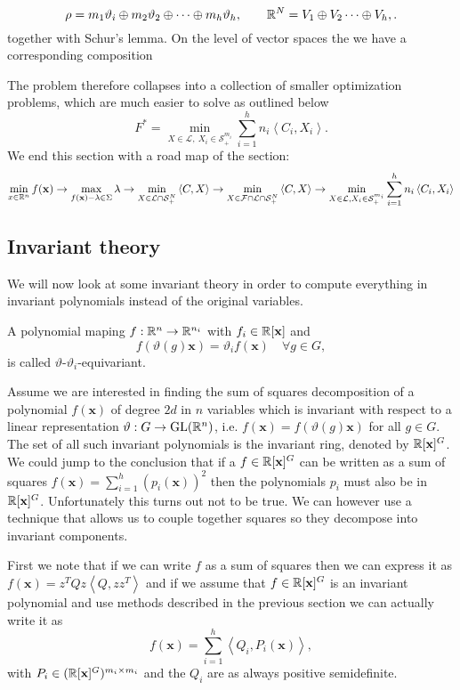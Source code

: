 \documentclass[]{article}
\begin{document}
\[\rho = m_1\vartheta_i\oplus m_2\vartheta_2 \oplus \cdots \oplus m_h\vartheta_h, \quad \quad \mathbb R^N = V_1\oplus V_2 \cdots \oplus V_h,.\]
together with Schur's lemma. 
On the level of vector spaces the we have a corresponding composition


The problem therefore collapses into a collection of smaller 
optimization problems, which are much easier to solve as outlined below 
\[F^\ast = \min_{X\in\mathcal{L},~X_i \in \mathcal{S}_+^{m_i} }\sum_{i=1}^{h} n_i\left<C_i,X_i\right>.\]
We end this section with a road map of the section:
\[\min_{x\in\mathbb R^n}f(\mathbf{x}) \rightarrow \max_{f(\mathbf{x})-\lambda\in \Sigma} \lambda \rightarrow\min_{X\in\mathcal{L}\cap \mathcal{S}_+^N } \left<C,X\right> \rightarrow 
\min_{X\in\mathcal{F}\cap\mathcal{L}\cap \mathcal{S}_+^N } \left<C,X\right> \rightarrow
\min_{X\in\mathcal{L}, X_i \in \mathcal{S}_+^{m_i} }\sum_{i=1}^{h} n_i\left<C_i,X_i\right>\]
\subsection*{Invariant theory}
We will now look at some invariant theory in order to compute everything in invariant polynomials instead of the original variables.

A polynomial maping $f:\mathbb R^n\rightarrow \mathbb R^{n_i}$ with $f_i\in\mathbb R[\mathbf{x}]$ and 
\[ f(\vartheta(g)\mathbf{x}) =\vartheta_i f(\mathbf{x})\quad \forall g\in G, \]
is called $\vartheta$-$\vartheta_i$-equivariant.

Assume we are interested in finding the sum of squares decomposition of a polynomial $f(\textbf{x})$ of degree $2d$ in $n$
variables which is invariant with respect to a linear representation $\vartheta:G\rightarrow \mathrm{GL}(\mathbb R^n)$, i.e. $f(\textbf{x}) = f(\vartheta(g)\textbf{x})$ for all $g\in G$.
The set of all such invariant polynomials is the invariant ring, denoted by $\mathbb R[\textbf{x}]^G$. We could jump to the conclusion that if a $f\in \mathbb R[\textbf{x}]^G$ can be written as a 
sum of squares $f(\textbf{x}) =\sum_{i=1}^{h}(p_i(\textbf{x}))^2$ then the polynomials $p_i$ must also be in $\mathbb R[\mathbf{x}]^G$. Unfortunately this turns out not to be true. We can however
use a technique that allows us to couple together squares so they decompose into invariant components.

First we note that if we can write $f$ as a sum of squares then we can express it as $f(\textbf{x}) = z^TQz \left<Q,zz^T\right>$ and if we assume that $f\in \mathbb R[\mathbf{x}]^G$ is an invariant polynomial and use methods described in the previous section we can actually write it as 
\[f(\textbf{x}) = \sum_{i=1}^{h}\left<Q_i,P_i(\mathbf{x})\right>,\]
with $P_i\in (\mathbb R[\mathbf{x}]^G)^{m_i\times m_i}$
and the $Q_i$ are as always positive semidefinite.  
\end{document}
